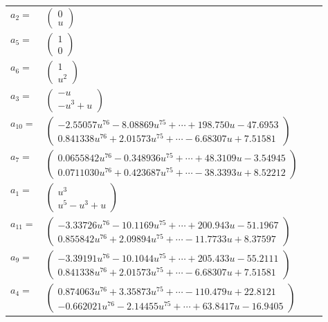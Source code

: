 \documentclass[1p]{elsarticle_modified}
\theoremstyle{definition}
\begin{document}
\begin{tabular}{m{7pt} m{180pt} m{7pt} m{180pt} }
\flushright $a_{2}=$&$\begin{pmatrix}0\\u\end{pmatrix}$ \\
\flushright $a_{5}=$&$\begin{pmatrix}1\\0\end{pmatrix}$ \\
\flushright $a_{6}=$&$\begin{pmatrix}1\\u^2\end{pmatrix}$ \\
\flushright $a_{3}=$&$\begin{pmatrix}- u\\- u^3+u\end{pmatrix}$ \\
\flushright $a_{10}=$&$\begin{pmatrix}-2.55057 u^{76}-8.08869 u^{75}+\cdots+198.750 u-47.6953\\0.841338 u^{76}+2.01573 u^{75}+\cdots-6.68307 u+7.51581\end{pmatrix}$ \\
\flushright $a_{7}=$&$\begin{pmatrix}0.0655842 u^{76}-0.348936 u^{75}+\cdots+48.3109 u-3.54945\\0.0711030 u^{76}+0.423687 u^{75}+\cdots-38.3393 u+8.52212\end{pmatrix}$ \\
\flushright $a_{1}=$&$\begin{pmatrix}u^3\\u^5- u^3+u\end{pmatrix}$ \\
\flushright $a_{11}=$&$\begin{pmatrix}-3.33726 u^{76}-10.1169 u^{75}+\cdots+200.943 u-51.1967\\0.855842 u^{76}+2.09894 u^{75}+\cdots-11.7733 u+8.37597\end{pmatrix}$ \\
\flushright $a_{9}=$&$\begin{pmatrix}-3.39191 u^{76}-10.1044 u^{75}+\cdots+205.433 u-55.2111\\0.841338 u^{76}+2.01573 u^{75}+\cdots-6.68307 u+7.51581\end{pmatrix}$ \\
\flushright $a_{4}=$&$\begin{pmatrix}0.874063 u^{76}+3.35873 u^{75}+\cdots-110.479 u+22.8121\\-0.662021 u^{76}-2.14455 u^{75}+\cdots+63.8417 u-16.9405\end{pmatrix}$ \\

\end{tabular}
\end{document}
